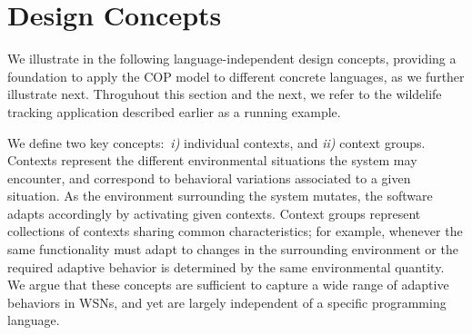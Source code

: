 \section{Design Concepts}\label{sec:appdesign}

We illustrate in the following language-independent design concepts,
providing a foundation to apply the COP model to different concrete
languages, as we further illustrate next. Throguhout this section and
the next, we refer to the wildelife tracking application described
earlier as a running example.

We define two key concepts:~\emph{i)} individual contexts, and
\emph{ii)} context groups. Contexts represent the different
environmental situations the system may encounter, and correspond to
behavioral variations associated to a given situation. As the
environment surrounding the system mutates, the software adapts
accordingly by activating given contexts. Context groups represent
collections of contexts sharing common characteristics; for example,
whenever the same functionality must adapt to changes in the
surrounding environment or the required adaptive behavior is
determined by the same environmental quantity. We argue that these
concepts are sufficient to capture a wide range of adaptive behaviors
in WSNs, and yet are largely independent of a specific programming
language.



